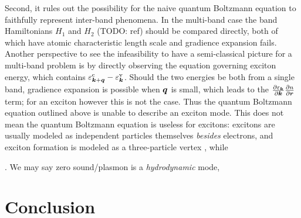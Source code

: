 \documentclass[hyperref, a4paper]{article}
\begin{document}
Second, it rules out the possibility 
for the naive quantum Boltzmann equation to faithfully represent 
inter-band phenomena.
In the multi-band case the band Hamiltonians 
$H_1$ and $H_2$ (TODO: ref) should be compared directly,
both of which have atomic characteristic length scale 
and gradience expansion fails.
Another perspective to see the infeasibility to have 
a semi-classical picture for a multi-band problem 
is by directly observing the equation 
governing exciton energy,
which contains $\varepsilon^{\text{c}}_{\vb*{k} + \vb*{q}} - \varepsilon^{\text{v}}_{\vb*{k}}$.
Should the two energies be both from a single band, 
gradience expansion is possible when $\vb*{q}$ is small, 
which leads to the $\pdv{\varepsilon_{\vb*{k}}}{\vb*{k}} \pdv{n}{\vb*{r}}$ term;
for an exciton however this is not the case.
Thus the quantum Boltzmann equation outlined above 
is unable to describe an exciton mode.
This does not mean the quantum Boltzmann equation is useless for excitons:
excitons are usually modeled as independent particles themselves
\emph{besides} electrons,
and exciton formation is modeled as 
a three-particle vertex \cite{klimontovich1981quantum},
while 

\cite{pines2018theory}.
We may say zero sound/plasmon is a \emph{hydrodynamic} mode,


\section{Conclusion}

\printbibliography
\end{document}
